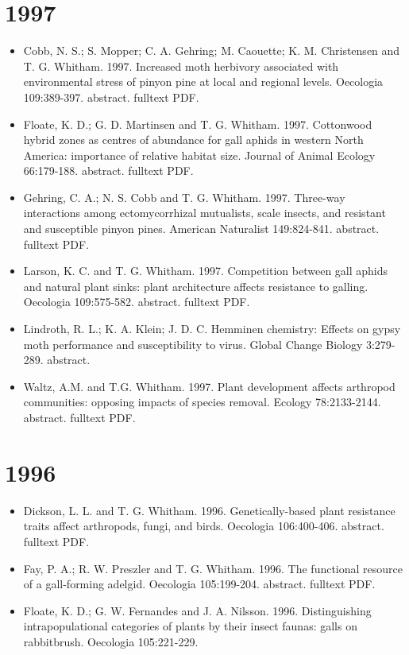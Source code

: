 \documentclass[12pt]{article}
\begin{document}
\section{1997}
\begin{itemize}
\item Cobb, N. S.; S. Mopper; C. A. Gehring; M. Caouette;
  K. M. Christensen and T. G. Whitham. 1997. Increased moth herbivory
  associated with environmental stress of pinyon pine at local and
  regional levels. Oecologia 109:389-397. abstract. fulltext PDF.
 
\item Floate, K. D.; G. D. Martinsen and T. G. Whitham. 1997. Cottonwood
hybrid zones as centres of abundance for gall aphids in western North
America: importance of relative habitat size. Journal of Animal
Ecology 66:179-188. abstract. fulltext PDF.
 
\item Gehring, C. A.; N. S. Cobb and T. G. Whitham. 1997. Three-way
interactions among ectomycorrhizal mutualists, scale insects, and
resistant and susceptible pinyon pines. American Naturalist
149:824-841. abstract. fulltext PDF.
 
\item Larson, K. C. and T. G. Whitham. 1997. Competition between gall aphids
and natural plant sinks: plant architecture affects resistance to
galling. Oecologia 109:575-582. abstract. fulltext PDF.
 
\item Lindroth, R. L.; K. A. Klein; J. D. C. Hemminen chemistry: Effects on
gypsy moth performance and susceptibility to virus. Global Change
Biology 3:279-289. abstract.
 
\item Waltz, A.M. and T.G. Whitham. 1997. Plant development affects
arthropod communities: opposing impacts of species removal. Ecology
78:2133-2144. abstract. fulltext PDF.
 
\end{itemize}

\section{1996}
\begin{itemize}
\item Dickson, L. L. and T. G. Whitham. 1996. Genetically-based plant
resistance traits affect arthropods, fungi, and birds. Oecologia
106:400-406. abstract. fulltext PDF.
 
\item Fay, P. A.; R. W. Preszler and T. G. Whitham. 1996. The functional
resource of a gall-forming adelgid. Oecologia
105:199-204. abstract. fulltext PDF.
 
\item Floate, K. D.; G. W. Fernandes and J. A. Nilsson. 1996. Distinguishing
intrapopulational categories of plants by their insect faunas: galls
on rabbitbrush. Oecologia 105:221-229.
 \end{itemize}
\end{document}
